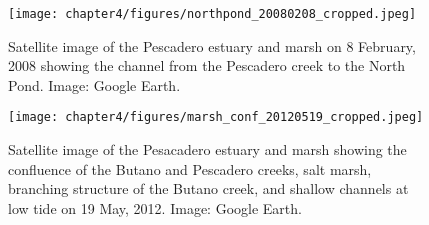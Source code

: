 \begin{figure}
\centering
	\texttt{[image: chapter4/figures/northpond\_20080208\_cropped.jpeg]}
	\caption{Satellite image of the Pescadero estuary and marsh on 8 February, 2008 showing the channel from the Pescadero creek to the North Pond. Image: Google Earth.} \label{fig:geNP}
\end{figure}


\begin{figure}
\centering
	\texttt{[image: chapter4/figures/marsh\_conf\_20120519\_cropped.jpeg]}
	\caption{Satellite image of the Pesacadero estuary and marsh showing the confluence of the Butano and Pescadero creeks, salt marsh, branching structure of the Butano creek, and shallow channels at low tide on 19 May, 2012. Image: Google Earth.} \label{fig:geMarsh}
\end{figure}
